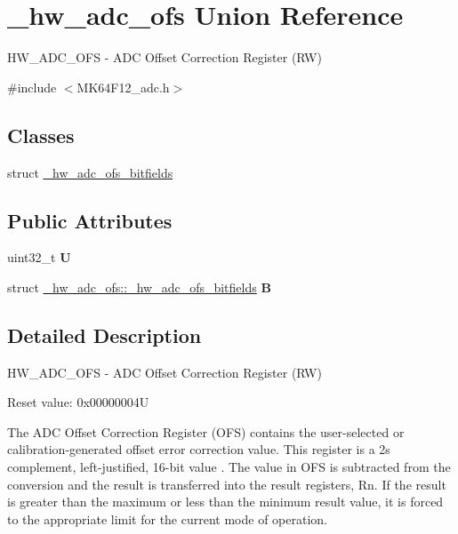 \hypertarget{union__hw__adc__ofs}{}\section{\+\_\+hw\+\_\+adc\+\_\+ofs Union Reference}
\label{union__hw__adc__ofs}


H\+W\+\_\+\+A\+D\+C\+\_\+\+O\+FS -\/ A\+DC Offset Correction Register (RW)  




{\ttfamily \#include $<$M\+K64\+F12\+\_\+adc.\+h$>$}

\subsection*{Classes}
\begin{DoxyCompactItemize}
\item 
struct \hyperlink{struct__hw__adc__ofs_1_1__hw__adc__ofs__bitfields}{\+\_\+hw\+\_\+adc\+\_\+ofs\+\_\+bitfields}
\end{DoxyCompactItemize}
\subsection*{Public Attributes}
\begin{DoxyCompactItemize}
\item 
uint32\+\_\+t {\bfseries U}\hypertarget{union__hw__adc__ofs_aea954896ec9fbcf25d3c7f977a1810b7}{}\label{union__hw__adc__ofs_aea954896ec9fbcf25d3c7f977a1810b7}

\item 
struct \hyperlink{struct__hw__adc__ofs_1_1__hw__adc__ofs__bitfields}{\+\_\+hw\+\_\+adc\+\_\+ofs\+::\+\_\+hw\+\_\+adc\+\_\+ofs\+\_\+bitfields} {\bfseries B}\hypertarget{union__hw__adc__ofs_a7f23cf567a584f858cd511108312c1fb}{}\label{union__hw__adc__ofs_a7f23cf567a584f858cd511108312c1fb}

\end{DoxyCompactItemize}


\subsection{Detailed Description}
H\+W\+\_\+\+A\+D\+C\+\_\+\+O\+FS -\/ A\+DC Offset Correction Register (RW) 

Reset value\+: 0x00000004U

The A\+DC Offset Correction Register (O\+FS) contains the user-\/selected or calibration-\/generated offset error correction value. This register is a 2\textquotesingle{}s complement, left-\/justified, 16-\/bit value . The value in O\+FS is subtracted from the conversion and the result is transferred into the result registers, Rn. If the result is greater than the maximum or less than the minimum result value, it is forced to the appropriate limit for the current mode of operation. 

